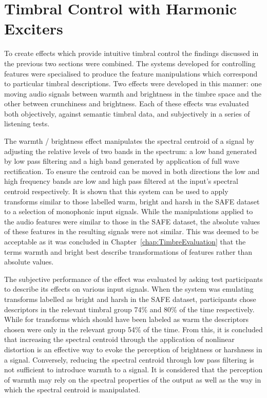 \section{Timbral Control with Harmonic Exciters}
\label{sec:Conclusion-TimbralControl}
	To create effects which provide intuitive timbral control the findings discussed in the previous two sections were
	combined. The systems developed for controlling features were specialised to produce the feature manipulations which
	correspond to particular timbral descriptions. Two effects were developed in this manner: one moving audio signals
	between warmth and brightness in the timbre space and the other between crunchiness and brightness. Each of these
	effects was evaluated both objectively, against semantic timbral data, and subjectively in a series of listening
	tests.

	The warmth / brightness effect manipulates the spectral centroid of a signal by adjusting the relative levels of two
	bands in the spectrum: a low band generated by low pass filtering and a high band generated by application of full
	wave rectification. To ensure the centroid can be moved in both directions the low and high frequency bands are low
	and high pass filtered at the input's spectral centroid respectively. It is shown that this system can be used to
	apply transforms similar to those labelled warm, bright and harsh in the SAFE dataset to a selection of monophonic
	input signals. While the manipulations applied to the audio features were similar to those in the SAFE dataset, the
	absolute values of these features in the resulting signals were not similar. This was deemed to be acceptable as it
	was concluded in Chapter~\ref{chap:TimbreEvaluation} that the terms warmth and bright best describe transformations
	of features rather than absolute values.

	The subjective performance of the effect was evaluated by asking test participants to describe its effects on
	various input signals. When the system was emulating transforms labelled as bright and harsh in the SAFE dataset,
	participants chose descriptors in the relevant timbral group 74\% and 80\% of the time respectively. While for
	transforms which should have been labeled as warm the descriptors chosen were only in the relevant group 54\% of the
	time. From this, it is concluded that increasing the spectral centroid through the application of nonlinear
	distortion is an effective way to evoke the perception of brightness or harshness in a signal. Conversely, reducing
	the spectral centroid through low pass filtering is not sufficient to introduce warmth to a signal. It is considered
	that the perception of warmth may rely on the spectral properties of the output as well as the way in which the
	spectral centroid is manipulated.

